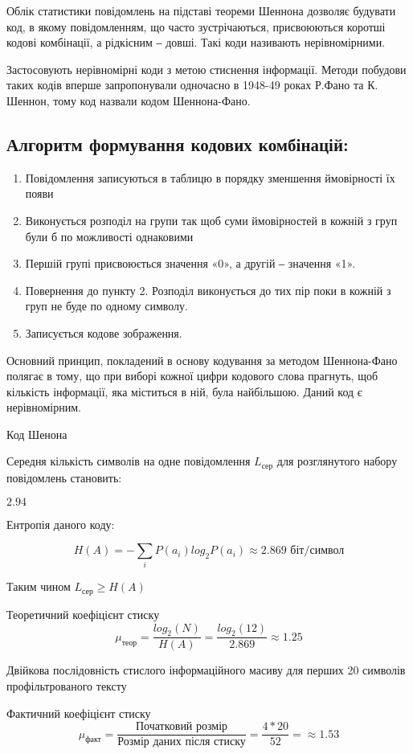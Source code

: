 \documentclass[a4paper,14pt]{extreport}
\begin{document}
Облік статистики повідомлень на підставі теореми Шеннона дозволяє будувати код, в якому повідомленням, що часто зустрічаються, присвоюються коротші кодові комбінації, а рідкісним ‒ довші. Такі коди називають нерівномірними.

Застосовують нерівномірні коди з метою стиснення інформації. Методи побудови таких кодів вперше запропонували одночасно в 1948-49 роках Р.Фано та К. Шеннон, тому код назвали кодом Шеннона-Фано.

\subsection{Алгоритм формування кодових комбінацій:}
\begin{enumerate}
	\item Повідомлення записуються в таблицю в порядку зменшення ймовірності їх появи
	\item Виконується розподіл на групи так щоб суми ймовірностей в кожній з груп були б по можливості однаковими
	\item Першій групі присвоюється значення «0», а другій ‒ значення «1».
	\item Повернення до пункту 2. Розподіл виконується до тих пір поки в кожній з груп не буде по одному символу.
	\item Записується кодове зображення.
\end{enumerate}

Основний принцип, покладений в основу кодування за методом Шеннона-Фано полягає в тому, що при виборі кожної цифри кодового слова прагнуть, щоб кількість інформації, яка міститься в ній, була найбільшою. Даний код є нерівномірним.

\begin{table}[H]
	\caption{Код Шенона}
	\centering	
		
	\label{table:shannon_encoding}
\end{table}
Середня кількість символів на одне повідомлення $L_{\text{сер}}$ для розглянутого набору повідомлень становить: 


$2.94$

Ентропія даного коду:

$$H(A) = - \sum_{i}P(a_i)log_2P(a_i) \approx 2.869 \text{ біт/символ}$$ 

Таким чином $L_{\text{сер}} \geq H(A)$ 

Теоретичний коефіцієнт стиску $$\mu_{\text{теор}} = \frac{log_2(N)}{H(A) } = \frac{log_2(12)}{2.869} \approx 1.25$$

\begin{table}[H]
	\caption{Двійкова послідовність стислого інформаційного масиву для перших 20 символів профільтрованого тексту}
	\centering	
		
	\label{table:compressed}
\end{table}
Фактичний коефіцієнт стиску $$\mu_{\text{факт}} = \frac{\text{Початковий розмір}}{\text{Розмір даних після стиску}} = \frac{4 *20 }{52}=  \approx 1.53$$

\printbibliography[heading=none]
\end{document}
